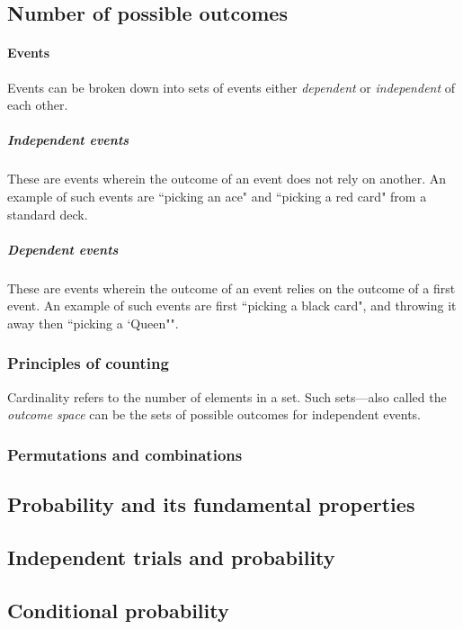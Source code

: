 \subsection{Number of possible outcomes}
\paragraph{Events}
Events can be broken down into sets of events either \emph{dependent} or \emph{independent} of each other.
\subparagraph{Independent events}
These are events wherein the outcome of an event does not rely on another.
An example of such events are ``picking an ace" and ``picking a red card" from a standard deck.
\subparagraph{Dependent events}
These are events wherein the outcome of an event relies on the outcome of a first event.
An example of such events are first ``picking a black card", and throwing it away then ``picking a `Queen"\!".

\subsubsection{Principles of counting}
Cardinality refers to the number of elements in a set.
Such sets---also called the \emph{outcome space} can be the sets of possible outcomes for independent events.

\subsubsection{Permutations and combinations}

\subsection{Probability and its fundamental properties}

\subsection{Independent trials and probability}

\subsection{Conditional probability}

